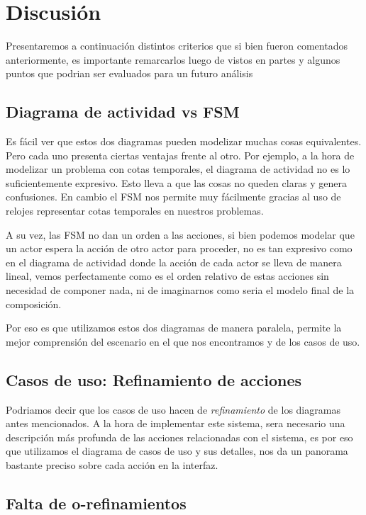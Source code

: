 \section{Discusi\'on}

Presentaremos a continuación distintos criterios que si bien fueron comentados anteriormente, es importante remarcarlos luego de vistos en partes y algunos puntos que podrian ser evaluados para un futuro análisis

\subsection{Diagrama de actividad vs FSM}

Es fácil ver que estos dos diagramas pueden modelizar muchas cosas equivalentes. Pero cada uno presenta ciertas ventajas frente al otro.
Por ejemplo, a la hora de modelizar un problema con cotas temporales, el diagrama de actividad no es lo suficientemente expresivo. Esto lleva a que las cosas no queden claras y genera confusiones. En cambio el FSM nos permite muy fácilmente gracias al uso de relojes representar cotas temporales en nuestros problemas.

A su vez, las FSM no dan un orden a las acciones, si bien podemos modelar que un actor espera la acción de otro actor para proceder, no es tan expresivo como en el diagrama de actividad donde la acción de cada actor se lleva de manera lineal, vemos perfectamente como es el orden relativo de estas acciones sin necesidad de componer nada, ni de imaginarnos como seria el modelo final de la composición.

Por eso es que utilizamos estos dos diagramas de manera paralela, permite la mejor comprensión del escenario en el que nos encontramos y de los casos de uso.

\subsection{Casos de uso: Refinamiento de acciones}

Podriamos decir que los casos de uso hacen de \textit{refinamiento} de los diagramas antes mencionados. A la hora de implementar este sistema, sera necesario una descripción más profunda de las acciones relacionadas con el sistema, es por eso que utilizamos el diagrama de casos de uso y sus detalles, nos da un panorama bastante preciso sobre cada acción en la interfaz. 

\subsection{Falta de o-refinamientos}

